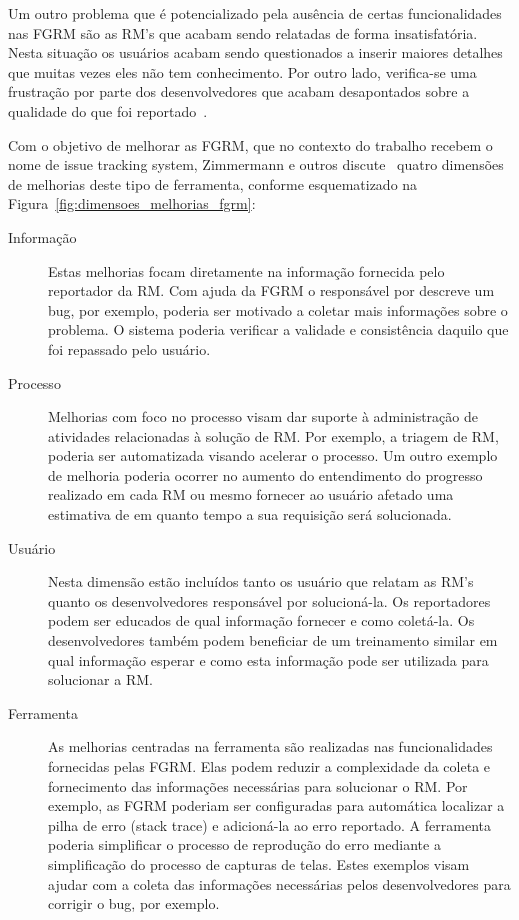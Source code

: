 Um outro problema que é potencializado pela ausência de certas funcionalidades
nas FGRM são as RM's que acabam sendo relatadas de forma insatisfatória. Nesta
situação os usuários acabam sendo questionados a inserir maiores detalhes que
muitas vezes eles não tem conhecimento. Por outro lado, verifica-se uma
frustração por parte dos desenvolvedores que acabam desapontados sobre a
qualidade do que foi reportado~\cite{just2008towards}.

Com o objetivo de melhorar as FGRM, que no contexto do trabalho recebem o nome
de issue tracking system, Zimmermann e outros
discute~\cite{zimmermann2009improving} quatro dimensões de melhorias deste tipo
de ferramenta, conforme esquematizado na
Figura~\ref{fig:dimensoes_melhorias_fgrm}:

\begin{description}
	\item[Informação] Estas melhorias focam diretamente na informação fornecida
		pelo reportador da RM\@. Com ajuda da FGRM o responsável por descreve um
		bug, por exemplo, poderia ser motivado a coletar mais informações sobre o
		problema. O sistema poderia verificar a validade e consistência daquilo
		que foi repassado pelo usuário.
   \item[Processo] Melhorias com foco no processo visam dar suporte à
	   administração de atividades relacionadas à solução de RM\@. Por exemplo, a
	   triagem de RM, poderia ser automatizada visando acelerar o processo. Um
	   outro exemplo de melhoria poderia ocorrer no aumento do entendimento do
	   progresso realizado em cada RM ou mesmo fornecer ao usuário afetado uma
	   estimativa de em quanto tempo a sua requisição será solucionada. 
	\item[Usuário] Nesta dimensão estão incluídos tanto os usuário que relatam
		as RM's quanto os desenvolvedores responsável por solucioná-la. Os
		reportadores podem ser educados de qual informação fornecer e como
		coletá-la. Os desenvolvedores também podem beneficiar de um treinamento
		similar em qual informação esperar e como esta informação pode ser
		utilizada para solucionar a RM\@.
	\item[Ferramenta] As melhorias centradas na ferramenta são realizadas nas
		funcionalidades fornecidas pelas FGRM\@. Elas podem reduzir a complexidade
		da coleta e fornecimento das informações necessárias para solucionar o
		RM\@. Por exemplo, as FGRM poderiam ser configuradas para automática
		localizar a pilha de erro (stack trace) e adicioná-la ao erro reportado.
		A ferramenta poderia simplificar o processo de reprodução do erro
		mediante a simplificação do processo de capturas de telas. Estes
		exemplos visam ajudar com a coleta das informações necessárias pelos
		desenvolvedores para corrigir o bug, por exemplo.
\end{description}

